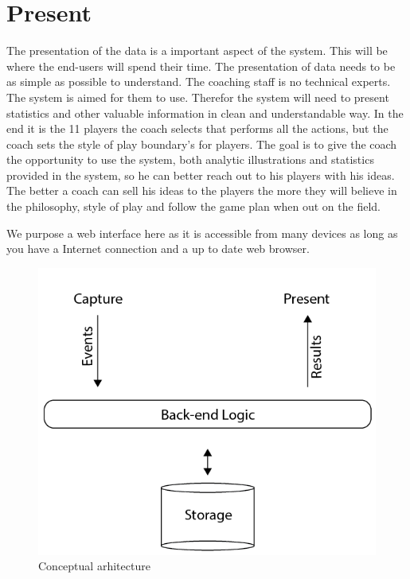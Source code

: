 \section{Present}

The presentation of the data is a important aspect of the system. This will be where the end-users will spend their time. The presentation of data needs to be as simple as possible to understand. The coaching staff is no technical experts. The system is  aimed for them to use. Therefor the system will need to present statistics and other valuable information in clean and understandable way. In the end it is the 11 players the coach selects that performs all the actions, but the coach sets the style of play boundary's for players. The goal is to give the coach the opportunity to use the system, both analytic illustrations and statistics provided in the system, so he can better reach out to his players with his ideas. The better a coach can sell his ideas to the players the more they will believe in the philosophy, style of play and follow the game plan when out on the field.

We purpose a web interface here as it is accessible from many devices as long as you have a Internet connection and a up to date web browser. 



\begin{figure}[ht!]
\centering
\includegraphics[width=150mm]{images/architecture/conceptual_architecture.png}
\caption{Conceptual arhitecture}
\label{overflow}
\end{figure}
